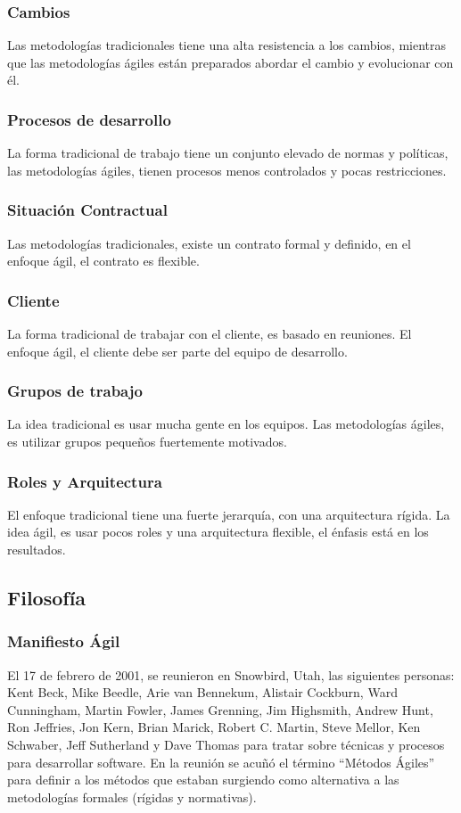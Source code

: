 \documentclass[12pt]{beamer}
\begin{document}
\begin{frame}
 \frametitle{Cambios}
 Las metodologías tradicionales tiene una alta resistencia a los cambios, mientras que las metodologías ágiles están preparados abordar el cambio y evolucionar con él.
\end{frame}


\begin{frame}
 \frametitle{Procesos de desarrollo}
 La forma tradicional de trabajo tiene un conjunto elevado de normas y políticas, las metodologías ágiles, tienen procesos menos controlados y pocas restricciones.
\end{frame}

\begin{frame}
 \frametitle{Situación Contractual}
 Las metodologías tradicionales, existe un contrato formal y definido, en el enfoque ágil, el contrato es flexible.
\end{frame}


\begin{frame}
 \frametitle{Cliente}
 La forma tradicional de trabajar con el cliente, es basado en reuniones. El enfoque ágil, el cliente debe ser parte del equipo de desarrollo.
\end{frame}

\begin{frame}
 \frametitle{Grupos de trabajo}
 La idea tradicional es usar mucha gente en los equipos. Las metodologías ágiles, es utilizar grupos pequeños fuertemente motivados.
\end{frame}


\begin{frame}
 \frametitle{Roles y Arquitectura}
 El enfoque tradicional tiene una fuerte jerarquía, con una arquitectura rígida. La idea ágil, es usar pocos roles y una arquitectura flexible, el énfasis está en los resultados.
\end{frame}


\subsection{Filosofía}

\begin{frame}
 \frametitle{Manifiesto Ágil}
 El 17 de febrero de 2001, se reunieron en Snowbird, Utah, las siguientes personas:  Kent Beck, Mike Beedle, Arie van Bennekum, Alistair Cockburn, Ward Cunningham, Martin Fowler, James Grenning, Jim Highsmith, Andrew Hunt, Ron Jeffries, Jon Kern, Brian Marick, Robert C. Martin, Steve Mellor, Ken Schwaber, Jeff Sutherland y Dave Thomas para tratar sobre técnicas y procesos para desarrollar software. En la reunión se acuñó el término ``Métodos Ágiles'' para definir a los métodos que estaban surgiendo como alternativa a las metodologías formales (rígidas y normativas).
\end{frame}
\end{document}
